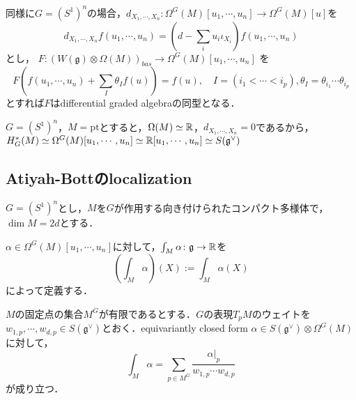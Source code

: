 \begin{eg}
  同様に$G=(S^1)^n$の場合，$d_{X_1,\cdots,X_n}\colon\Omega^G(M)[u_1,\cdots,u_n]\rightarrow\Omega^G(M)[u]$を
  \[
  d_{X_1,\cdots,X_n}f(u_1,\cdots,u_n) =(d-\sum_{i}u_i\iota_{X_i})f(u_1,\cdots,u_n) 
  \]
  とし，
  $
  F\colon (W(\mathfrak{g})\otimes\Omega(M))_{bas}\rightarrow \Omega^G(M)[u_1,\cdots,u_n]
  $
  を
  \[
  F(f(u_1,\cdots,u_n) + \sum_{I}\theta_If(u)) = f(u),\quad I=(i_1<\cdots<i_p),\theta_I = \theta_{i_1}\cdots\theta_{i_p}
  \]
  とすれば$F$はdifferential graded algebraの同型となる．
\end{eg}

\begin{eg}\label{equiv cohomology of point}
  $G=(S^1)^n$，$M=\text{pt}$とすると，$\Omega(M)\simeq\mathbb{R}$，$d_{X_1,\cdots,X_n} = 0$であるから，$H^*_G(M)\simeq\Omega^G(M)[u_1,\cdots,u_n]\simeq \mathbb{R}[u_1,\cdots,u_n]\simeq S(\mathfrak{g}^\vee)$
\end{eg}




\subsection{Atiyah-Bottのlocalization}


$G=(S^1)^n$とし，$M$を$G$が作用する向き付けられたコンパクト多様体で，$\dim M = 2d$とする．

\begin{defin}
  $\alpha\in\Omega^G(M)[u_1,\cdots,u_n]$に対して，$\int_M\alpha\colon\mathfrak{g}\rightarrow\mathbb{R}$を
  \[
  \left(\int_M\alpha\right)(X) := \int_M\alpha(X)
  \]
  によって定義する．
\end{defin}

\begin{theo}\label{localization}
  $M$の固定点の集合$M^G$が有限であるとする．$G$の表現$T_pM$のウェイトを$w_{1,p},\cdots,w_{d,p}\in S(\mathfrak{g}^\vee)$とおく．equivariantly closed form $\alpha\in S(\mathfrak{g}^\vee)\otimes\Omega^G(M)$に対して，
  \[
  \int_M\alpha = \sum_{p\in M^G}\frac{\alpha|_p}{w_{1,p}\cdots w_{d,p}}
  \]
  が成り立つ．
\end{theo}

